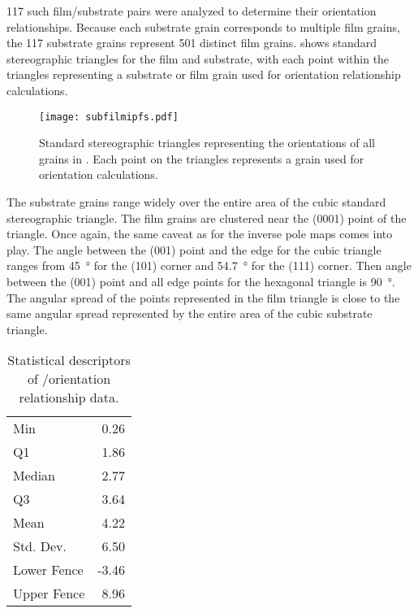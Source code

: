 117 such film/substrate pairs were analyzed to determine their orientation relationships. Because each substrate grain corresponds to multiple film grains, the 117 substrate grains represent 501 distinct film grains.  shows standard stereographic triangles for the film and substrate, with each point within the triangles representing a substrate or film grain used for orientation relationship calculations.
\begin{figure}
	\texttt{[image: subfilmipfs.pdf]}
		\caption[Orientation of film and substrate grains]{%
			Standard stereographic triangles representing the orientations
			of all grains in . Each point on the 
			triangles represents a grain used for orientation calculations.}
	\label{fig:subfilmipfs}
\end{figure}
The substrate grains range widely over the entire area of the cubic standard stereographic triangle. The film grains are clustered near the (0001) point of the triangle. Once again, the same caveat as for the inverse pole maps comes into play. The angle between the (001) point and the edge for the cubic triangle ranges from \SI{45}{\degree} for the (101) corner and \SI{54.7}{\degree} for the (111) corner. Then angle between the (001) point and all edge points for the hexagonal triangle is \SI{90}{\degree}. The angular spread of the points represented in the film triangle is close to the same angular spread represented by the entire area of the cubic substrate triangle.
\begin{table}
	
	\begin{center}
\begin{tabular}{lr}
	
		Min &
		0.26 \\
		
		Q1 &
		1.86 \\
		
		Median &
		2.77 \\
		
		Q3 &
		3.64 \\
		
		Mean &
		4.22 \\
		
		Std. Dev. &
		6.50 \\
		
		Lower Fence &
		-3.46 \\
		
		Upper Fence &
		8.96 \\
		
	\end{tabular}

\end{center}	\caption[Statistical descriptors of orientation relationship data]{Statistical descriptors of \feo[0001]/\sto[111] orientation relationship data.}
	\label{tab:outofplanestats}


\end{table}


